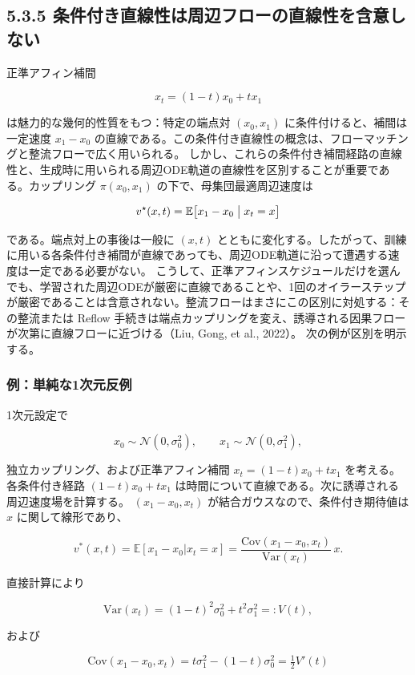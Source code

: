\subsection*{5.3.5 条件付き直線性は周辺フローの直線性を含意しない}


正準アフィン補間

\[
x_t=(1-t)x_0+t x_1
\]


は魅力的な幾何的性質をもつ：特定の端点対 $(x_0,x_1)$ に条件付けると、補間は一定速度 $x_1-x_0$ の直線である。この条件付き直線性の概念は、フローマッチングと整流フローで広く用いられる。
しかし、これらの条件付き補間経路の直線性と、生成時に用いられる周辺ODE軌道の直線性を区別することが重要である。カップリング $\pi(x_0,x_1)$ の下で、母集団最適周辺速度は

\[
v^\star(x,t)=\mathbb{E}\bigl[x_1-x_0\bigm|x_t=x\bigr]
\]


である。端点対上の事後は一般に $(x,t)$ とともに変化する。したがって、訓練に用いる各条件付き補間が直線であっても、周辺ODE軌道に沿って遭遇する速度は一定である必要がない。
こうして、正準アフィンスケジュールだけを選んでも、学習された周辺ODEが厳密に直線であることや、1回のオイラーステップが厳密であることは含意されない。整流フローはまさにこの区別に対処する：その整流または Reflow 手続きは端点カップリングを変え、誘導される因果フローが次第に直線フローに近づける（Liu, Gong, et al., 2022）。
次の例が区別を明示する。

\subsubsection*{例：単純な1次元反例}


1次元設定で

\[
x_0\sim\mathcal{N}(0,\sigma_0^2),\qquad x_1\sim\mathcal{N}(0,\sigma_1^2),
\]


独立カップリング、および正準アフィン補間 $x_t=(1-t)x_0+t x_1$ を考える。各条件付き経路 $(1-t)x_0+t x_1$ は時間について直線である。次に誘導される周辺速度場を計算する。
$(x_1-x_0,x_t)$ が結合ガウスなので、条件付き期待値は $x$ に関して線形であり、

\[
v^*(x,t)=\mathbb{E}[x_1-x_0|x_t=x]=\frac{\mathrm{Cov}(x_1-x_0,x_t)}{\mathrm{Var}(x_t)}\,x.
\]


直接計算により

\[
\mathrm{Var}(x_t)=(1-t)^2\sigma_0^2+t^2\sigma_1^2=:V(t),
\]


および

\[
\mathrm{Cov}(x_1-x_0,x_t)=t\sigma_1^2-(1-t)\sigma_0^2=\tfrac{1}{2}V'(t)
\]


